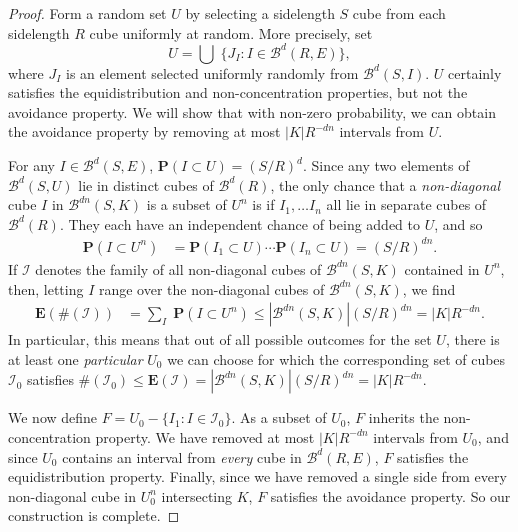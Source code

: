 \documentclass{article}
\theoremstyle{plain}
\theoremstyle{plain}
\begin{document}
\begin{proof}
	Form a random set $U$ by selecting a sidelength $S$ cube from each sidelength $R$ cube uniformly at random. More precisely, set
	\[ U = \bigcup\; \{ J_I: I \in \mathcal{B}^d(R,E) \}, \]
	where $J_I$ is an element selected uniformly randomly from $\mathcal{B}^d(S,I)$. $U$ certainly satisfies the equidistribution and non-concentration properties, but not the avoidance property. We will show that with non-zero probability, we can obtain the avoidance property by removing at most $|K|R^{-dn}$ intervals from $U$.

	For any $I \in \mathcal{B}^d(S,E)$, $\mathbf{P}(I \subset U) = (S/R)^d$. Since any two elements of $\mathcal{B}^d(S,U)$ lie in distinct cubes of $\mathcal{B}^d(R)$, the only chance that a {\it non-diagonal} cube $I$ in $\mathcal{B}^{dn}(S,K)$ is a subset of $U^n$ is if $I_1, \dots I_n$ all lie in separate cubes of $\mathcal{B}^d(R)$. They each have an independent chance of being added to $U$, and so
	\begin{align*}
		\mathbf{P}(I \subset U^n) &= \mathbf{P}(I_1 \subset U) \cdots \mathbf{P}(I_n \subset U) = (S/R)^{dn}.
	\end{align*}
	If $\mathcal{I}$ denotes the family of all non-diagonal cubes of $\mathcal{B}^{dn}(S,K)$ contained in $U^n$, then, letting $I$ range over the non-diagonal cubes of $\mathcal{B}^{dn}(S,K)$, we find
	\begin{align*}
		\mathbf{E}(\# (\mathcal{I})) &= {\sum}_I\; \mathbf{P}(I \subset U^n) \leq |\mathcal{B}^{dn}(S,K)| (S/R)^{dn} = |K| R^{-dn}.
	\end{align*}
	In particular, this means that out of all possible outcomes for the set $U$, there is at least one {\it particular} $U_0$ we can choose for which the corresponding set of cubes $\mathcal{I}_0$ satisfies $\#(\mathcal{I}_0) \leq \mathbf{E}(\mathcal{I}) = |\mathcal{B}^{dn}(S,K)| (S/R)^{dn} = |K| R^{-dn}$.

	We now define $F = U_0 - \{ I_1 : I \in \mathcal{I}_0 \}$. As a subset of $U_0$, $F$ inherits the non-concentration property. We have removed at most $|K| R^{-dn}$ intervals from $U_0$, and since $U_0$ contains an interval from {\it every} cube in $\mathcal{B}^d(R,E)$, $F$ satisfies the equidistribution property. Finally, since we have removed a single side from every non-diagonal cube in $U_0^n$ intersecting $K$, $F$ satisfies the avoidance property. So our construction is complete.
\end{proof}
\end{document}

